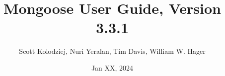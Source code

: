 \title{Mongoose User Guide, Version 3.3.1}
\author{Scott Kolodziej, Nuri Yeralan, Tim Davis, William W. Hager}
\date{Jan XX, 2024}
